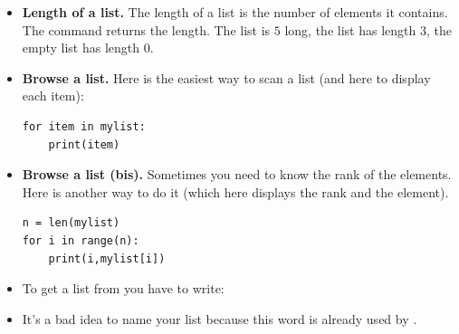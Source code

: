 \documentclass[11pt,class=report,crop=false]{standalone}
\begin{document}
\begin{cours}[List (2)]
\sauteligne
\begin{itemize}
  \item \textbf{Length of a list.} The length of a list is the number of elements it contains. The command  returns the length. The list \ci{[5,4,3,2,1]} is $5$ long, the list  has length $3$, the empty list \ci{[]} has length $0$.
  
  \item \textbf{Browse a list.} 
	Here is the easiest way to scan a list (and here to display each item):
\begin{lstlisting}
for item in mylist:
    print(item)
\end{lstlisting}

  \item \textbf{Browse a list (bis).} 
  Sometimes you need to know the rank of the elements. Here is another way to do it (which here displays the rank and the element).
\begin{lstlisting}
n = len(mylist)
for i in range(n):
    print(i,mylist[i])
\end{lstlisting}  

\item To get a list from  you have to write:

\item It's a bad idea to name your list \og{}\fg{} because this word is already used by \Python{}.
\end{itemize}
\end{cours}



\end{document}
